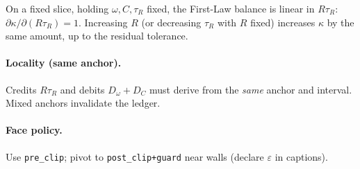 \begin{proposition}
On a fixed slice, holding \(\omega,C,\tau_{R}\) fixed, the First-Law balance is linear in \(R\tau_{R}\): \(\partial \kappa / \partial (R\tau_{R}) = 1\).
Increasing \(R\) (or decreasing \(\tau_{R}\) with \(R\) fixed) increases \(\kappa\) by the same amount, up to the residual tolerance.
\end{proposition}

\paragraph{Locality (same anchor).}
Credits \(R\tau_{R}\) and debits \(D_{\omega}+D_{C}\) must derive from the \emph{same} anchor and interval. Mixed anchors invalidate the ledger.

\paragraph{Face policy.}
Use \texttt{pre\_clip}; pivot to \texttt{post\_clip+guard} near walls (declare \(\varepsilon\) in captions).

